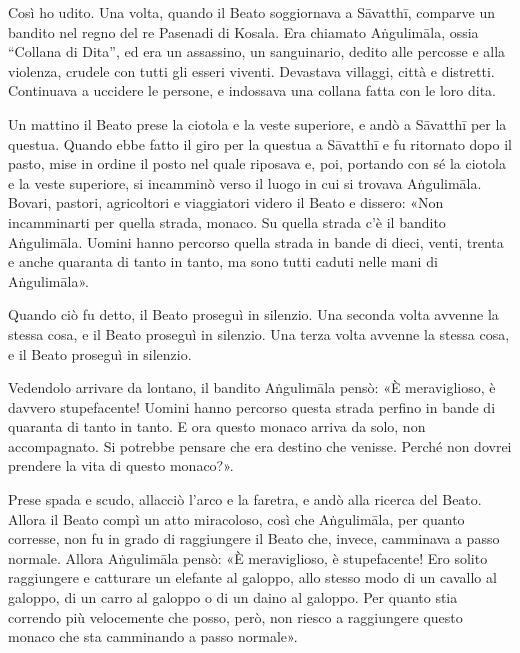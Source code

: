  Così ho udito. Una volta, quando il Beato soggiornava a
Sāvatthī, comparve un bandito nel regno del re Pasenadi di Kosala. Era chiamato
Aṅgulimāla, ossia “Collana di Dita”, ed era un assassino, un sanguinario, dedito
alle percosse e alla violenza, crudele con tutti gli esseri viventi. Devastava
villaggi, città e distretti. Continuava a uccidere le persone, e indossava una
collana fatta con le loro dita.

Un mattino il Beato prese la ciotola e la veste superiore, e andò a Sāvatthī per
la questua. Quando ebbe fatto il giro per la questua a Sāvatthī e fu ritornato
dopo il pasto, mise in ordine il posto nel quale riposava e, poi, portando con
sé la ciotola e la veste superiore, si incamminò verso il luogo in cui si
trovava Aṅgulimāla. Bovari, pastori, agricoltori e viaggiatori
videro il Beato e dissero: «Non incamminarti per quella strada, monaco. Su
quella strada c’è il bandito Aṅgulimāla. Uomini hanno percorso quella strada in
bande di dieci, venti, trenta e anche quaranta di tanto in tanto, ma sono tutti
caduti nelle mani di Aṅgulimāla».

Quando ciò fu detto, il Beato proseguì in silenzio. Una seconda volta avvenne la
stessa cosa, e il Beato proseguì in silenzio. Una terza volta avvenne la stessa
cosa, e il Beato proseguì in silenzio.

Vedendolo arrivare da lontano, il bandito Aṅgulimāla pensò: «È meraviglioso, è
davvero stupefacente! Uomini hanno percorso questa strada perfino in bande di
quaranta di tanto in tanto. E ora questo monaco arriva da solo, non
accompagnato. Si potrebbe pensare che era destino che venisse. Perché non dovrei
prendere la vita di questo monaco?».

Prese spada e scudo, allacciò l’arco e la faretra, e andò alla ricerca del
Beato. Allora il Beato compì un atto miracoloso, così che Aṅgulimāla, per quanto
corresse, non fu in grado di raggiungere il Beato che, invece, camminava a passo
normale. Allora Aṅgulimāla pensò: «È meraviglioso, è stupefacente! Ero solito
raggiungere e catturare un elefante al galoppo, allo stesso modo di un cavallo
al galoppo, di un carro al galoppo o di un daino al galoppo. Per quanto stia
correndo più velocemente che posso, però, non riesco a raggiungere questo monaco
che sta camminando a passo normale».

